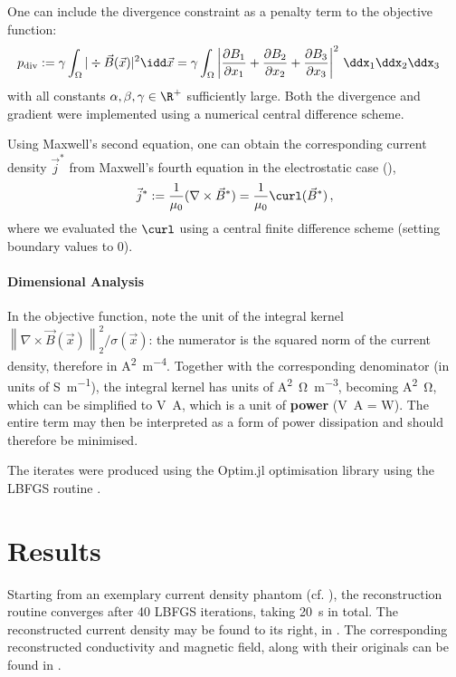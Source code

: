 \documentclass[10pt]{article}
\newcommand{\sfrac}[2]{{#1 / #2}}
\renewcommand{\norm}[1]{\left\lVert#1\right\rVert_{\scriptscriptstyle 2}}
\begin{document}
  One can include the divergence constraint as a penalty term to the objective function:
  \begin{align*}
    p_{\rm div} := \gamma \int_\Omega |\div \vec{B}(\vec{x})|^2 \idd\vec{x} & = \gamma \int_\Omega \left|\frac{\partial B_1}{\partial x_1} + \frac{\partial B_2}{\partial x_2} + \frac{\partial B_3}{\partial x_3}\right|^2 \,\ddx_1\ddx_2\ddx_3
  \end{align*}
  with all constants $\alpha, \beta, \gamma \in \R^+$ sufficiently large.
  Both the divergence and gradient were implemented using a numerical central difference scheme.

  Using Maxwell's second equation, one can obtain the corresponding current density $\vec{j}^*$ from Maxwell's fourth equation in the electrostatic case (),
  $$\vec{j}^* := \frac{1}{\mu_0} (\nabla \times \vec{B}^*) = \frac{1}{\mu_0} \curl(\vec{B}^*)\,,$$
  where we evaluated the $\curl$ using a central finite difference scheme (setting boundary values to 0).

  \paragraph{Dimensional Analysis}
  In the objective function, note the unit of the integral kernel $\sfrac{\norm{\nabla \times \vec{B}(\vec{x})}^2}{\sigma(\vec{x})}$: the numerator is the squared norm of the current density, therefore in \unit{\ampere\squared\per\meter^4}. Together with the corresponding denominator (in units of \unit{\siemens\per\meter}), the integral kernel has units of \unit{\ampere\squared\ohm\per\meter^3}, becoming \unit{\ampere\squared\ohm}, which can be simplified to \unit{\volt\ampere}, which is a unit of \textbf{power} (\unit{\volt\ampere} = \unit{W}).
  The entire term may then be interpreted as a form of power dissipation and should therefore be minimised.

  The iterates were produced using the Optim.jl optimisation library \parencite{2018-optim-jl} using the LBFGS routine \parencite{1989-lbfgs}.

  \section{Results}
  \label{sec:results}
  Starting from an exemplary current density phantom (cf. ), the reconstruction routine converges after 40 LBFGS iterations, taking \SI{20}{\second} in total.
  The reconstructed current density may be found to its right, in .
  The corresponding reconstructed conductivity and magnetic field, along with their originals can be found in .
\end{document}
